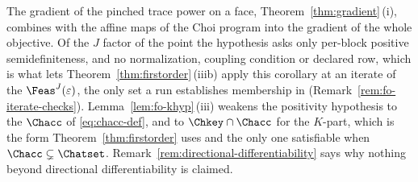 
The gradient of the pinched trace power on a face,
Theorem~\ref{thm:gradient}\,(i), combines with the affine maps of the Choi
program into the gradient of the whole objective. Of the $J$ factor of the
point the hypothesis asks only per-block positive semidefiniteness, and no
normalization, coupling condition or declared row, which is what lets
Theorem~\ref{thm:firstorder}\,(iiib) apply this corollary at an iterate of
the  $\Feas^{J}(\varepsilon)$, the only set a
run establishes membership in (Remark~\ref{rem:fo-iterate-checks}).
Lemma~\ref{lem:fo-khyp}\,(iii) weakens the positivity hypothesis to the
 $\Chacc$ of \eqref{eq:chacc-def}, and to
$\Chkey\cap\Chacc$ for the $K$-part, which is the form
Theorem~\ref{thm:firstorder} uses and the only one satisfiable when
$\Chacc\subsetneq\Chatset$. Remark~\ref{rem:directional-differentiability}
says why nothing beyond directional differentiability is claimed.

